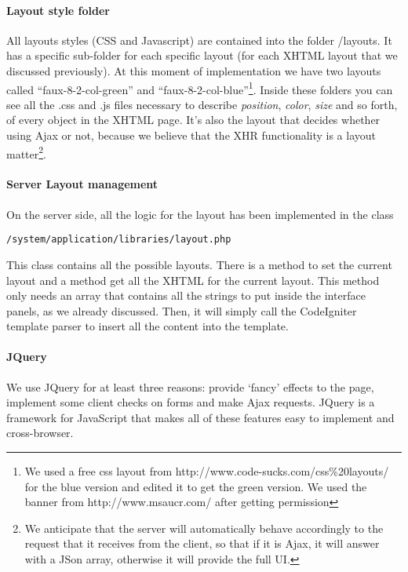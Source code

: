 \paragraph{Layout style folder}
All layouts styles (CSS and Javascript) are contained into the folder /layouts. It has a specific sub-folder for each specific layout (for each XHTML layout that we discussed previously). At this moment of implementation we have two layouts called ``faux-8-2-col-green'' and ``faux-8-2-col-blue''\footnote{We used a free css layout from http://www.code-sucks.com/css\%20layouts/ for the blue version and edited it to get the green version. We used the banner from http://www.msaucr.com/ after getting permission}. Inside these folders you can see all the .css and .js files necessary to describe \emph{position}, \emph{color}, \emph{size} and so forth, of every object in the XHTML page. It's also the layout that decides whether using Ajax or not, because we believe that the XHR functionality is a layout matter\footnote{We anticipate that the server will automatically behave accordingly to the request that it receives from the client, so that if it is Ajax, it will answer with a JSon array, otherwise it will provide the full UI.}.

\paragraph{Server Layout management}
On the server side, all the logic for the layout has been implemented in the class \begin{verbatim}/system/application/libraries/layout.php
\end{verbatim}
This class contains all the possible layouts. There is a method to set the current layout and a method get all the XHTML for the current layout. This method only needs an array that contains all the strings to put inside the interface panels, as we already discussed. Then, it will simply call the CodeIgniter template parser to insert all the content into the template.

\paragraph{JQuery}
We use JQuery for at least three reasons: provide `fancy' effects to the page, implement some client checks on forms and make Ajax requests. JQuery is a framework for JavaScript that makes all of these features easy to implement and cross-browser.


